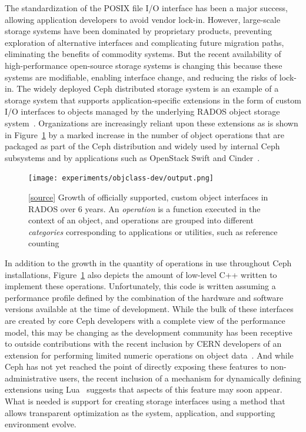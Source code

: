 \documentclass[10pt,twocolumn]{article}
\begin{document}

The standardization of the POSIX file I/O interface has been a major success,
allowing application developers to avoid vendor lock-in. However, large-scale
storage systems have been dominated by proprietary products, preventing
exploration of alternative interfaces and complicating future migration paths,
eliminating the benefits of commodity systems. But the recent availability of
high-performance open-source storage systems is changing this because these
systems are modifiable, enabling interface change, and reducing the risks of
lock-in. The widely deployed Ceph distributed storage system is an example of
a storage system that supports application-specific extensions in the form of
custom I/O interfaces to objects managed by the underlying RADOS object
storage system~\cite{weil:osdi06,weil:pdsw07}. Organizations are increasingly
reliant upon these extensions as is shown in Figure~\ref{fig:objclass-dev} by
a marked increase in the number of object operations that are packaged as part
of the Ceph distribution and widely used by internal Ceph subsystems and by
applications such as OpenStack Swift and Cinder~\cite{openstack}.

\begin{figure}[t]
  \centering
    \texttt{[image: experiments/objclass-dev/output.png]}
    \caption{
[\href{https://github.com/noahdesu/zlog-popper/tree/master/experiments/objclass-dev/visualize.ipynb}{source}]
Growth of officially supported, custom object interfaces in RADOS over 6
years. An \emph{operation} is a function executed in the context of an object,
and operations are grouped into different \emph{categories}
corresponding to applications or utilities, such as reference counting}
\label{fig:objclass-dev}
\end{figure}

In addition to the growth in the quantity of operations in use throughout Ceph
installations, Figure~\ref{fig:objclass-dev} also depicts the amount of
low-level C++ written to implement these operations. Unfortunately, this code
is written assuming a performance profile defined by the combination of the
hardware and software versions available at the time of development.  While
the bulk of these interfaces are created by core Ceph developers with a
complete view of the performance model, this may be changing as the
development community has been receptive to outside contributions with the
recent inclusion by CERN developers of an extension for performing limited
numeric operations on object data~\cite{cls_numops}. And while Ceph has not
yet reached the point of directly exposing these features to
non-administrative users, the recent inclusion of a mechanism for dynamically
defining extensions using Lua~\cite{cls_lua} suggests that aspects of this
feature may soon appear. What is needed is support for creating storage
interfaces using a method that allows transparent optimization as the system,
application, and supporting environment evolve.
\end{document}
